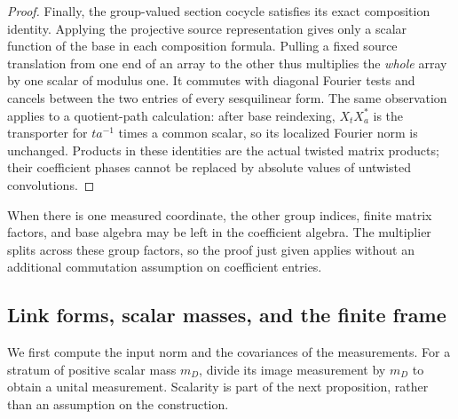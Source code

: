 \begin{proof}
Finally, the group-valued section cocycle satisfies its exact
composition identity. Applying the projective source representation
gives only a scalar function of the base in each composition
formula. Pulling a fixed source translation from one end of an
array to the other thus multiplies the \emph{whole} array by one
scalar of modulus one. It commutes with diagonal Fourier tests and
cancels between the two entries of every sesquilinear form. The
same observation applies to a quotient-path calculation: after
base reindexing, \(X_tX_a^*\) is the transporter for \(ta^{-1}\)
times a common scalar, so its localized Fourier norm is unchanged.
Products in these identities are the actual twisted matrix
products; their coefficient phases cannot be replaced by absolute
values of untwisted convolutions.
\end{proof}

When there is one measured coordinate, the other group indices,
finite matrix factors, and base algebra may be left in the
coefficient algebra. The multiplier splits across these group
factors, so the proof just given applies without an additional
commutation assumption on coefficient entries.

\subsection{Link forms, scalar masses, and the finite frame}

We first compute the input norm and the covariances of the measurements.
For a stratum of positive scalar mass $m_D$, divide its image measurement
by $m_D$ to obtain a unital measurement. Scalarity is part of the next
proposition, rather than an assumption on the construction.

